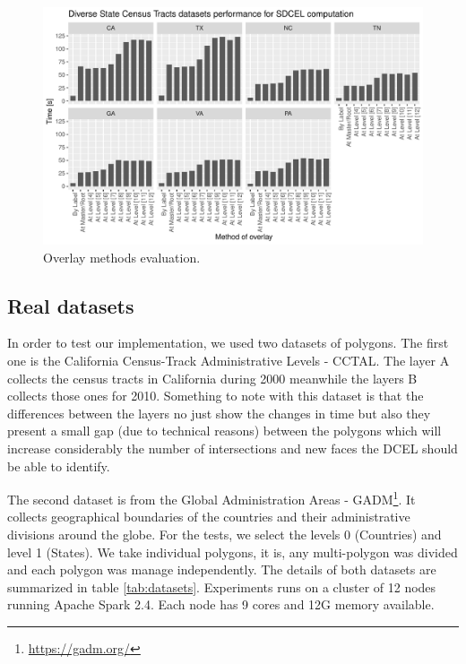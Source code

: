 \begin{figure}[!ht]
    \centering
    \includegraphics[width=\linewidth]{figures/experiments/Overlay_Tester}
    \caption{Overlay methods evaluation.}\label{fig:overlay_tester}
\end{figure}

\subsection{Real datasets}
In order to test our implementation, we used two datasets of polygons.  The first one is the California Census-Track Administrative Levels - CCTAL. The layer A collects the census tracts in California during 2000 meanwhile the layers B collects those ones for 2010.  Something to note with this dataset is that the differences between the layers no just show the changes in time but also they present a small gap (due to technical reasons) between the polygons which will increase considerably the number of intersections and new faces the DCEL should be able to identify.

The second dataset is from the Global Administration Areas - GADM\footnote{\url{https://gadm.org/}}. It collects geographical boundaries of the countries and their administrative divisions around the globe.  For the tests, we select the levels 0 (Countries) and level 1 (States). We take individual polygons, it is, any multi-polygon was divided and each polygon was manage independently. The details of both datasets are summarized in table \ref{tab:datasets}.  Experiments runs on a cluster of 12 nodes running Apache Spark 2.4.  Each node has 9 cores and 12G memory available.

